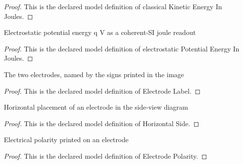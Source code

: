 \begin{proof}
  This is the declared model definition of classical Kinetic Energy In Joules.
\end{proof}
\begin{definition}
  \label{def:physics:phyx-mini-0908:phyxminiproblems-problemphyxmini0908-electrostaticpotentialenergyinjoules}
  Electrostatic potential energy q V as a coherent-SI joule readout
\end{definition}
\begin{proof}
  This is the declared model definition of electrostatic Potential Energy In Joules.
\end{proof}
\begin{definition}
  \label{def:physics:phyx-mini-0908:phyxminiproblems-problemphyxmini0908-electrodelabel}
  The two electrodes, named by the signs printed in the image
\end{definition}
\begin{proof}
  This is the declared model definition of Electrode Label.
\end{proof}
\begin{definition}
  \label{def:physics:phyx-mini-0908:phyxminiproblems-problemphyxmini0908-horizontalside}
  Horizontal placement of an electrode in the side-view diagram
\end{definition}
\begin{proof}
  This is the declared model definition of Horizontal Side.
\end{proof}
\begin{definition}
  \label{def:physics:phyx-mini-0908:phyxminiproblems-problemphyxmini0908-electrodepolarity}
  Electrical polarity printed on an electrode
\end{definition}
\begin{proof}
  This is the declared model definition of Electrode Polarity.
\end{proof}
